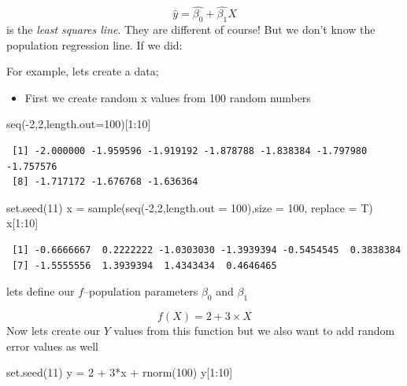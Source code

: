 \documentclass[
  letterpaper,
  DIV=11,
  numbers=noendperiod]{scrreprt}
\newenvironment{Shaded}{\begin{snugshade}}{\end{snugshade}}
\newcommand{\AttributeTok}[1]{\textcolor[rgb]{0.65,0.35,0.00}{#1}}
\newcommand{\DecValTok}[1]{\textcolor[rgb]{0.47,0.16,0.63}{#1}}
\newcommand{\FunctionTok}[1]{\textcolor[rgb]{0.02,0.16,0.49}{#1}}
\newcommand{\NormalTok}[1]{\textcolor[rgb]{0.33,0.33,0.33}{#1}}
\newcommand{\OtherTok}[1]{\textcolor[rgb]{0.85,0.12,0.09}{#1}}
\newcommand{\SpecialCharTok}[1]{\textcolor[rgb]{0.00,0.46,0.62}{#1}}
\providecommand{\tightlist}{%
  \setlength{\itemsep}{0pt}\setlength{\parskip}{0pt}}\usepackage{longtable,booktabs,array}
\begin{document}
\[
\hat{y} = \hat{\beta_0} + \hat{\beta_1}X
\] is the \emph{least squares line}. They are different of course! But
we don't know the population regression line. If we did:

For example, lets create a data;

\begin{itemize}
\tightlist
\item
  First we create random x values from 100 random numbers
\end{itemize}

\begin{Shaded}
\begin{Highlighting}[]
\FunctionTok{seq}\NormalTok{(}\SpecialCharTok{{-}}\DecValTok{2}\NormalTok{,}\DecValTok{2}\NormalTok{,}\AttributeTok{length.out=}\DecValTok{100}\NormalTok{)[}\DecValTok{1}\SpecialCharTok{:}\DecValTok{10}\NormalTok{]}
\end{Highlighting}
\end{Shaded}

\begin{verbatim}
 [1] -2.000000 -1.959596 -1.919192 -1.878788 -1.838384 -1.797980 -1.757576
 [8] -1.717172 -1.676768 -1.636364
\end{verbatim}

\begin{Shaded}
\begin{Highlighting}[]
\FunctionTok{set.seed}\NormalTok{(}\DecValTok{11}\NormalTok{)}
\NormalTok{x }\OtherTok{=} \FunctionTok{sample}\NormalTok{(}\FunctionTok{seq}\NormalTok{(}\SpecialCharTok{{-}}\DecValTok{2}\NormalTok{,}\DecValTok{2}\NormalTok{,}\AttributeTok{length.out =} \DecValTok{100}\NormalTok{),}\AttributeTok{size =} \DecValTok{100}\NormalTok{, }\AttributeTok{replace =}\NormalTok{ T)}
\NormalTok{x[}\DecValTok{1}\SpecialCharTok{:}\DecValTok{10}\NormalTok{]}
\end{Highlighting}
\end{Shaded}

\begin{verbatim}
 [1] -0.6666667  0.2222222 -1.0303030 -1.3939394 -0.5454545  0.3838384
 [7] -1.5555556  1.3939394  1.4343434  0.4646465
\end{verbatim}

lets define our \(f\)--population parameters \(\beta_0\) and \(\beta_1\)

\[
f(X) = 2 + 3\times X
\] Now lets create our \(Y\) values from this function but we also want
to add random error values as well

\begin{Shaded}
\begin{Highlighting}[]
\FunctionTok{set.seed}\NormalTok{(}\DecValTok{11}\NormalTok{)}
\NormalTok{y }\OtherTok{=} \DecValTok{2} \SpecialCharTok{+} \DecValTok{3}\SpecialCharTok{*}\NormalTok{x }\SpecialCharTok{+} \FunctionTok{rnorm}\NormalTok{(}\DecValTok{100}\NormalTok{)}
\NormalTok{y[}\DecValTok{1}\SpecialCharTok{:}\DecValTok{10}\NormalTok{]}
\end{Highlighting}
\end{Shaded}
\end{document}

